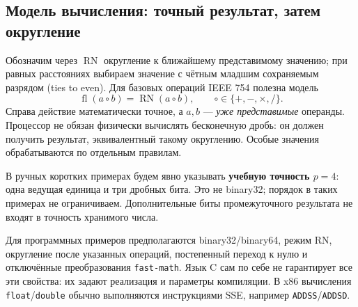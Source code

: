 \subsection{Модель вычисления: точный результат, затем округление}
Обозначим через $\operatorname{RN}$ округление к ближайшему
представимому значению; при равных расстояниях выбираем значение
с чётным младшим сохраняемым разрядом (ties to even).
Для базовых операций IEEE 754 полезна модель
\[
 \operatorname{fl}(a\circ b)=\operatorname{RN}(a\circ b),
 \qquad \circ\in\{+,-,\times,/\}.
\]
Справа действие математически точное, а $a,b$ --- \emph{уже представимые}
операнды. Процессор не обязан физически вычислять бесконечную дробь:
он должен получить результат, эквивалентный такому округлению.
Особые значения обрабатываются по отдельным правилам.

В ручных коротких примерах будем явно указывать \textbf{учебную точность
$p=4$}: одна ведущая единица и три дробных бита. Это не binary32;
порядок в таких примерах не ограничиваем. Дополнительные биты
промежуточного результата не входят в точность хранимого числа.

Для программных примеров предполагаются binary32/binary64, режим RN,
округление после указанных операций, постепенный переход к нулю и
отключённые преобразования \texttt{fast-math}. Язык C сам по себе
не гарантирует все эти свойства: их задают реализация и параметры
компиляции. В x86 вычисления \texttt{float}/\texttt{double} обычно
выполняются инструкциями SSE, например \texttt{ADDSS}/\texttt{ADDSD}.
